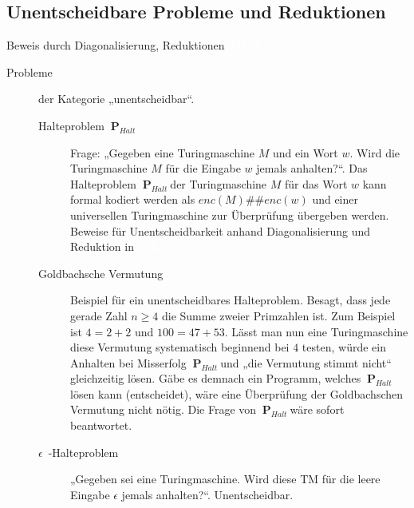 \documentclass[a4paper,10pt]{article}
\newcommand{\vl}[1]{\colorbox{vl}{\textcolor{white}{\small\textbf{#1}}}}
\newcommand{\prob}[1]{\textbf{#1}}
\newcommand{\phalt}{$~\prob{P}_{Halt}~$}
\begin{document}
    \subsection{Unentscheidbare Probleme und Reduktionen}
    Beweis durch Diagonalisierung, Reduktionen \vl{TIL 4}
    \begin{description}
        \item[Probleme] der Kategorie „unentscheidbar“.
        \begin{description}
            \item[Halteproblem \phalt] Frage: „Gegeben eine Turingmaschine $M$ und ein Wort $w$. Wird die Turingmaschine $M$ für die Eingabe $w$ jemals anhalten?“. Das Halteproblem \phalt der Turingmaschine $M$ für das Wort $w$ kann formal kodiert werden als $enc(M)\#\#enc(w)$ und einer universellen Turingmaschine zur Überprüfung übergeben werden. Beweise für Unentscheidbarkeit anhand Diagonalisierung und Reduktion in \vl{TIL 4}

            \item[Goldbachsche Vermutung] Beispiel für ein unentscheidbares Halteproblem. Besagt, dass jede gerade Zahl $n \ge 4$ die Summe zweier Primzahlen ist. Zum Beispiel ist $4 = 2 + 2$ und $100 = 47 + 53$. Lässt man nun eine Turingmaschine diese Vermutung systematisch beginnend bei $4$ testen, würde ein Anhalten bei Misserfolg \phalt und „die Vermutung stimmt nicht“ gleichzeitig lösen. Gäbe es demnach ein Programm, welches \phalt lösen kann (entscheidet), wäre eine Überprüfung der Goldbachschen Vermutung nicht nötig. Die Frage von \phalt wäre sofort beantwortet.

            \item[$\epsilon$~-Halteproblem] „Gegeben sei eine Turingmaschine. Wird diese TM für die leere Eingabe $\epsilon$ jemals anhalten?“. Unentscheidbar.
        \end{description}


\end{description}
\end{document}
